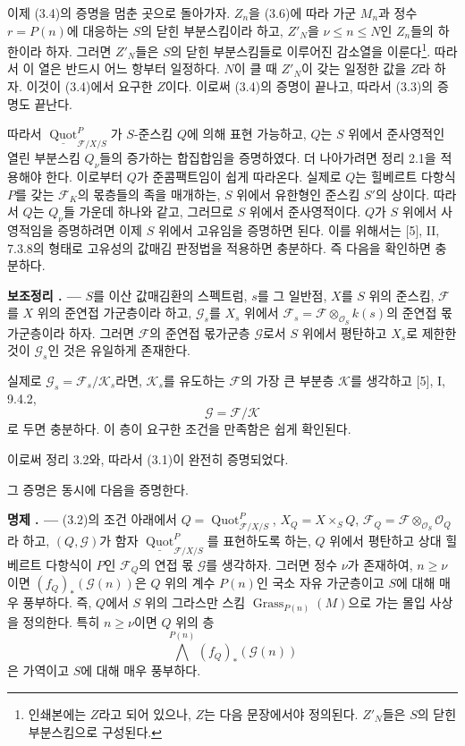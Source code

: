 \documentclass[11pt,twoside,openany]{book}
\numberwithin{equation}{section}
\newcommand{\sourceunit}{front}
\newcommand{\src}[1]{%
  \phantomsection\hypertarget{src:\sourceunit:#1}{}%
  \marginpar{\raggedleft\footnotesize\sffamily #1}%
}
\theoremstyle{plain}
\theoremstyle{definition}
\theoremstyle{remark}
\newcommand{\result}[2]{%
  \par\medskip\noindent\textbf{#1%
  \if\relax\detokenize{#2}\relax\else\space#2\fi. ---}\enspace
}
\begin{document}
이제 (3.4)의 증명을 멈춘 곳으로 돌아가자. $Z_n$을 (3.6)에 따라 가군
$M_n$과 정수 $r=P(n)$에 대응하는 $S$의 닫힌 부분스킴이라 하고,
$Z'_N$을 $\nu\leq n\leq N$인 $Z_n$들의 하한이라 하자. 그러면
$Z'_N$들은 $S$의 닫힌 부분스킴들로 이루어진 감소열을 이룬다\footnote{인쇄본에는 $Z$라고 되어 있으나, $Z$는 다음 문장에서야 정의된다.
$Z'_N$들은 $S$의 닫힌 부분스킴으로 구성된다.}. 따라서 이 열은 반드시
어느 항부터 일정하다. $N$이 클 때 $Z'_N$이 갖는 일정한 값을 $Z$라 하자.
이것이 (3.4)에서 요구한 $Z$이다. 이로써 (3.4)의 증명이 끝나고, 따라서
(3.3)의 증명도 끝난다.

따라서 $\underline{\operatorname{Quot}}^P_{\mathcal F/X/S}$가
$S$-준스킴 $Q$에 의해 표현 가능하고, $Q$는 $S$ 위에서 준사영적인 열린
부분스킴 $Q_\nu$들의 증가하는 합집합임을 증명하였다. 더 나아가려면
정리 2.1을 적용해야 한다. 이로부터 $Q$가 준콤팩트임이 쉽게 따라온다.
실제로 $Q$는 힐베르트 다항식 $P$를 갖는 $\mathcal F_K$의 몫층들의 족을
매개하는, $S$ 위에서 유한형인 준스킴 $S'$의 상이다. 따라서 $Q$는
$Q_\nu$들 가운데 하나와 같고, 그러므로 $S$ 위에서 준사영적이다. $Q$가
$S$ 위에서 사영적임을 증명하려면 이제 $S$ 위에서 고유임을 증명하면
된다. 이를 위해서는 [5], II, 7.3.8의 형태로 고유성의 값매김 판정법을
적용하면 충분하다. 즉 다음을 확인하면 충분하다.

\result{보조정리}{3.7} $S$를 이산 값매김환의 스펙트럼, $s$를 그 일반점,
$X$를 $S$ 위의 준스킴, $\mathcal F$를 $X$ 위의 준연접 가군층이라 하고,
$\mathcal G_s$를 $X_s$ 위에서
$\mathcal F_s=\mathcal F\otimes_{\mathcal O_S}k(s)$의 준연접 몫가군층이라 하자.
그러면 $\mathcal F$의 준연접 몫가군층 $\mathcal G$로서 $S$ 위에서 평탄하고
$X_s$로 제한한 것이 $\mathcal G_s$인 것은 유일하게 존재한다.
\src{265}
실제로 $\mathcal G_s=\mathcal F_s/\mathcal K_s$라면, $\mathcal K_s$를
유도하는 $\mathcal F$의 가장 큰 부분층 $\mathcal K$를 생각하고 [5], I,
9.4.2,
\[
\mathcal G=\mathcal F/\mathcal K
\]
로 두면 충분하다. 이 층이 요구한 조건을 만족함은 쉽게 확인된다.

이로써 정리 3.2와, 따라서 (3.1)이 완전히 증명되었다.

그 증명은 동시에 다음을 증명한다.

\result{명제}{3.8} (3.2)의 조건 아래에서
$Q=\operatorname{Quot}^P_{\mathcal F/X/S}$,
$X_Q=X\times_SQ$,
$\mathcal F_Q=\mathcal F\otimes_{\mathcal O_S}\mathcal O_Q$라 하고,
$(Q,\mathcal G)$가 함자
$\underline{\operatorname{Quot}}^P_{\mathcal F/X/S}$를 표현하도록 하는,
$Q$ 위에서 평탄하고 상대 힐베르트 다항식이 $P$인 $\mathcal F_Q$의
연접 몫 $\mathcal G$를 생각하자. 그러면 정수 $\nu$가 존재하여,
$n\geq\nu$이면 $(f_Q)_*(\mathcal G(n))$은 $Q$ 위의 계수 $P(n)$인
국소 자유 가군층이고 $S$에 대해 매우 풍부하다. 즉, $Q$에서 $S$ 위의
그라스만 스킴 $\operatorname{Grass}_{P(n)}(M)$으로 가는 몰입 사상을
정의한다. 특히 $n\geq\nu$이면 $Q$ 위의 층
\[
\bigwedge^{P(n)}(f_Q)_*(\mathcal G(n))
\]
은 가역이고 $S$에 대해 매우 풍부하다.
\end{document}
